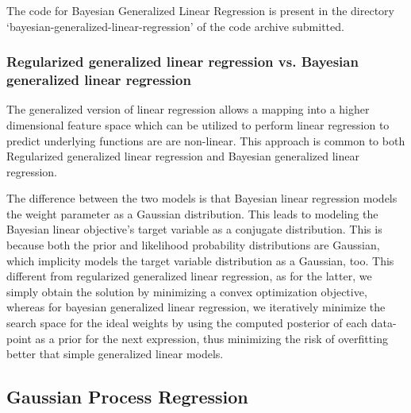 \documentclass[parskip=full]{scrartcl}
\begin{document}
        The code for Bayesian Generalized Linear Regression is present in the directory `bayesian-generalized-linear-regression' of the code archive submitted.

        \subsubsection*{Regularized generalized linear regression vs. Bayesian generalized linear regression} %
        \label{ssub:regularized_generalized_linear_regression_vs_bayesian_generalized_linear_regression}

            The generalized version of linear regression allows a mapping into a higher dimensional feature space which can be utilized to perform linear regression to predict underlying functions are are non-linear. This approach is common to both Regularized generalized linear regression and Bayesian generalized linear regression.

            The difference between the two models is that Bayesian linear regression models the weight parameter as a Gaussian distribution. This leads to modeling the Bayesian linear objective's target variable as a conjugate distribution. This is because both the prior and likelihood probability distributions are Gaussian, which implicity models the target variable distribution as a Gaussian, too. This different from regularized generalized linear regression, as for the latter, we simply obtain the solution by minimizing a convex optimization objective, whereas for bayesian generalized linear regression, we iteratively minimize the search space for the ideal weights by using the computed posterior of each data-point as a prior for the next expression, thus minimizing the risk of overfitting better that simple generalized linear models.
        
    

    \subsection{Gaussian Process Regression} %
    \label{sub:gaussian_process_regression}
    

\end{document}
